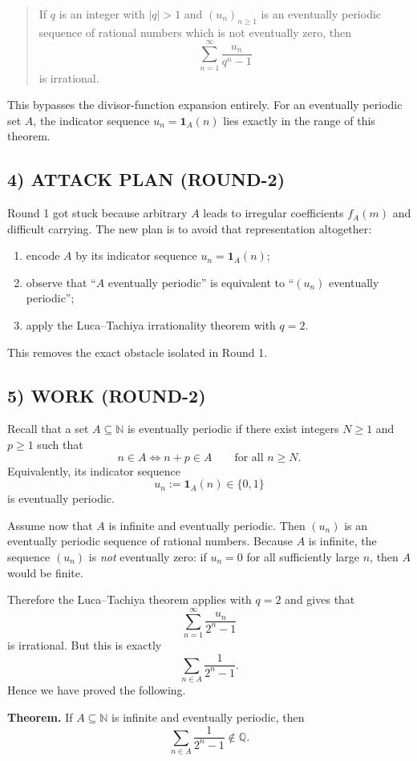 \begin{quote}
If $q$ is an integer with $|q|>1$ and $(u_n)_{n\ge 1}$ is an eventually periodic sequence of rational numbers which is not eventually zero, then
\[
\sum_{n=1}^{\infty}\frac{u_n}{q^n-1}
\]
is irrational.
\end{quote}

This bypasses the divisor-function expansion entirely. For an eventually periodic set $A$, the indicator sequence $u_n=\mathbf{1}_A(n)$ lies exactly in the range of this theorem.

\subsection*{4) ATTACK PLAN (ROUND-2)}
Round 1 got stuck because arbitrary $A$ leads to irregular coefficients $f_A(m)$ and difficult carrying. The new plan is to avoid that representation altogether:
\begin{enumerate}
\item encode $A$ by its indicator sequence $u_n=\mathbf{1}_A(n)$;
\item observe that ``$A$ eventually periodic'' is equivalent to ``$(u_n)$ eventually periodic'';
\item apply the Luca--Tachiya irrationality theorem with $q=2$.
\end{enumerate}
This removes the exact obstacle isolated in Round 1.

\subsection*{5) WORK (ROUND-2)}
Recall that a set $A\subseteq \mathbb{N}$ is eventually periodic if there exist integers $N\ge 1$ and $p\ge 1$ such that
\[
n\in A \iff n+p\in A\qquad \text{for all }n\ge N.
\]
Equivalently, its indicator sequence
\[
u_n:=\mathbf{1}_A(n)\in\{0,1\}
\]
is eventually periodic.

Assume now that $A$ is infinite and eventually periodic. Then $(u_n)$ is an eventually periodic sequence of rational numbers. Because $A$ is infinite, the sequence $(u_n)$ is \emph{not} eventually zero: if $u_n=0$ for all sufficiently large $n$, then $A$ would be finite.

Therefore the Luca--Tachiya theorem applies with $q=2$ and gives that
\[
\sum_{n=1}^{\infty}\frac{u_n}{2^n-1}
\]
is irrational. But this is exactly
\[
\sum_{n\in A}\frac{1}{2^n-1}.
\]
Hence we have proved the following.

\medskip
\noindent\textbf{Theorem.}
If $A\subseteq \mathbb{N}$ is infinite and eventually periodic, then
\[
\sum_{n\in A}\frac{1}{2^n-1}\notin \mathbb{Q}.
\]

